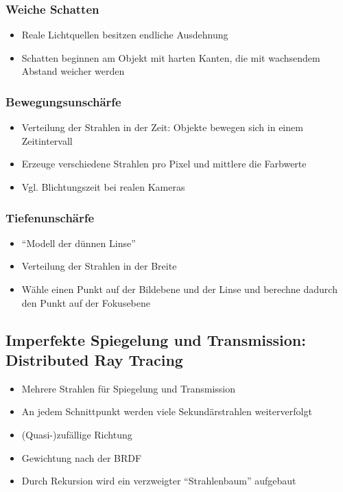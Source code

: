 \subsubsection{Weiche Schatten}
\begin{itemize}
	\item Reale Lichtquellen besitzen endliche Ausdehnung
	\item Schatten beginnen am Objekt mit harten Kanten, die mit wachsendem Abstand weicher werden
\end{itemize}

\subsubsection{Bewegungsunschärfe}
\begin{itemize}
	\item Verteilung der Strahlen in der Zeit: Objekte bewegen sich in einem Zeitintervall
	\item Erzeuge verschiedene Strahlen pro Pixel und mittlere die Farbwerte
	\item Vgl. Blichtungszeit bei realen Kameras
\end{itemize}

\subsubsection{Tiefenunschärfe}
\begin{itemize}
	\item "`Modell der dünnen Linse"'
	\item Verteilung der Strahlen in der Breite
	\item Wähle einen Punkt auf der Bildebene und der Linse und berechne dadurch den Punkt auf der Fokusebene
\end{itemize}

\subsection{Imperfekte Spiegelung und Transmission: Distributed Ray Tracing}
\begin{itemize}
	\item Mehrere Strahlen für Spiegelung und Transmission
	\item An jedem Schnittpunkt werden viele Sekundärstrahlen weiterverfolgt
	\item (Quasi-)zufällige Richtung
	\item Gewichtung nach der BRDF
	\item Durch Rekursion wird ein verzweigter "`Strahlenbaum"' aufgebaut
\end{itemize}



